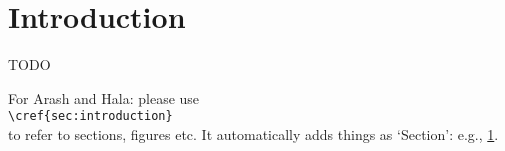 \section{Introduction}
\label{sec:introduction}

TODO

\color{red}
For Arash and Hala: please use \\{\tt \textbackslash cref\{sec:introduction\}}\\ to refer to sections, figures etc. It automatically adds things as `Section': e.g., \cref{sec:introduction}.
\color{black}
